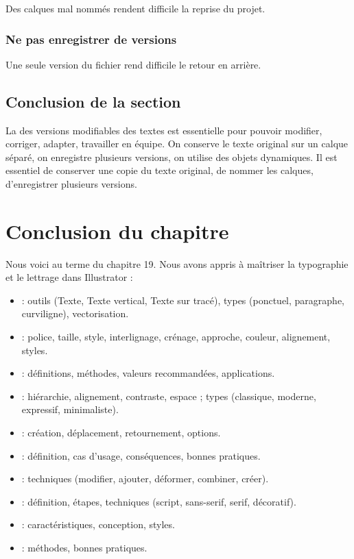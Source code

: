 Des calques mal nommés rendent difficile la reprise du projet.

\subsubsection{Ne pas enregistrer de versions}

Une seule version du fichier rend difficile le retour en arrière.

\subsection*{Conclusion de la section}

La  des versions modifiables des textes est essentielle pour pouvoir modifier, corriger, adapter, travailler en équipe. On conserve le texte original sur un calque séparé, on enregistre plusieurs versions, on utilise des objets dynamiques. Il est essentiel de conserver une copie du texte original, de nommer les calques, d'enregistrer plusieurs versions.

\section*{Conclusion du chapitre}

Nous voici au terme du chapitre 19. Nous avons appris à maîtriser la typographie et le lettrage dans Illustrator :

\begin{itemize}
    \item {} : outils (Texte, Texte vertical, Texte sur tracé), types (ponctuel, paragraphe, curviligne), vectorisation.
    \item {} : police, taille, style, interlignage, crénage, approche, couleur, alignement, styles.
    \item {} : définitions, méthodes, valeurs recommandées, applications.
    \item {} : hiérarchie, alignement, contraste, espace ; types (classique, moderne, expressif, minimaliste).
    \item {} : création, déplacement, retournement, options.
    \item {} : définition, cas d'usage, conséquences, bonnes pratiques.
    \item {} : techniques (modifier, ajouter, déformer, combiner, créer).
    \item {} : définition, étapes, techniques (script, sans-serif, serif, décoratif).
    \item {} : caractéristiques, conception, styles.
    \item {} : méthodes, bonnes pratiques.
\end{itemize}

